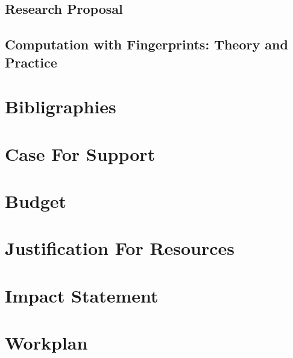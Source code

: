 \documentclass[a4paper,11pt]{article}
\begin{document}
    \begin{center}
        \section*{Research Proposal}
        \subsection*{Computation with Fingerprints: Theory and Practice}
    \end{center}

    \section{Bibligraphies}

    \section{Case For Support}

    \section{Budget}

    \section{Justification For Resources}

    \section{Impact Statement}

    \section{Workplan}
\end{document}
